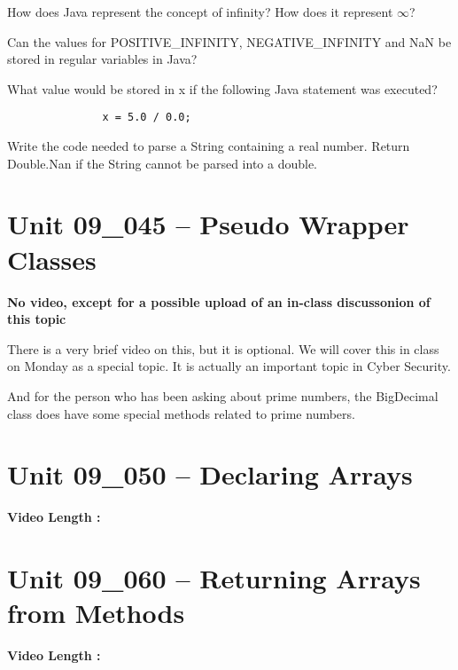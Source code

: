 \documentclass[letterpaper,12pt]{exam}
\newcommand{\unit}{Unit 09}
\begin{document}
\begin{questions}
\begin{samepage}
    \question How does Java represent the concept of infinity?  How does it represent $\infty$?
    \vspace{5mm}
\end{samepage}

\begin{samepage}
    \question Can the values for POSITIVE\_INFINITY, NEGATIVE\_INFINITY and NaN be stored in regular variables in Java?
    \vspace{5mm}
\end{samepage}

\begin{samepage}
    \question What value would be stored in x if the following Java statement was executed?
    \begin{verbatim}
               x = 5.0 / 0.0;
    \end{verbatim}
    \vspace{5mm}
\end{samepage}


\begin{samepage}
    \question Write the code needed to parse a String containing a real number.  Return Double.Nan if the String cannot be parsed into a double.
    \vspace{5mm}
\end{samepage}

\section*{\unit\_045 -- Pseudo Wrapper Classes} 
\par{\selectfont\textbf{No video, except for a possible upload of an in-class discussonion of this topic}}

There is a very brief video on this, but it is optional.  We will cover this in class on Monday as a special topic.  It is actually an important topic in Cyber Security.

And for the person who has been asking about prime numbers, the BigDecimal class does have some special methods related to prime numbers.

\section*{\unit\_050 -- Declaring Arrays} 
\par{\selectfont\textbf{Video Length :}}

\section*{\unit\_060 -- Returning Arrays from Methods} 
\par{\selectfont\textbf{Video Length :}}


\end{questions}
\end{document}
